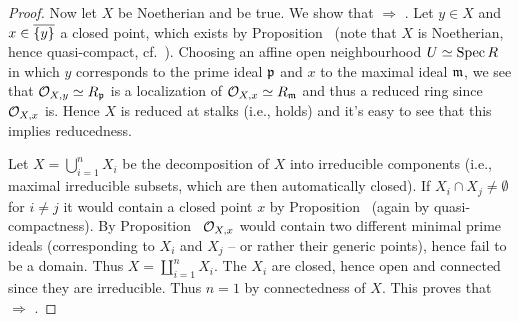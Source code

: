 \documentclass[a4paper,parskip=half,numbers=enddot, DIV=12]{scrreprt}
\begin{document}
\begin{proof}
    Now let $X$ be Noetherian and  be true. We show that  $\Rightarrow$ . Let $y\in X$ and $x\in\overline{\{y\}}$ a closed point, which exists by Proposition~ (note that $X$ is Noetherian, hence quasi-compact, cf.\ \cite[Definition~2.1.2]{alg1}). Choosing an affine open neighbourhood $U\simeq \operatorname{Spec} R$ in which $y$ corresponds to the prime ideal $\mathfrak{p}$ and $x$ to the maximal ideal $\mathfrak{m}$, we see that $\mathcal{O}_{X,y}\simeq R_{\mathfrak{p}}$ is a localization of $\mathcal{O}_{X,x}\simeq R_{\mathfrak{m}}$ and thus a reduced ring since $\mathcal{O}_{X,x}$ is. Hence $X$ is reduced at stalks (i.e.,  holds) and it's easy to see that this implies reducedness.
    
    Let $X=\bigcup_{i=1}^nX_i$ be the decomposition of $X$ into irreducible components (i.e., maximal irreducible subsets, which are then automatically closed). If $X_i\cap X_j \neq \emptyset$ for $i\neq j$ it would contain a closed point $x$ by Proposition~ (again by quasi-compactness). By Proposition~ $\mathcal{O}_{X,x}$ would contain two different minimal prime ideals (corresponding to $X_i$ and $X_j$ -- or rather their generic points), hence fail to be a domain. Thus $X=\coprod_{i=1}^nX_i$. The $X_i$ are closed, hence open and connected since they are irreducible. Thus $n=1$ by connectedness of $X$. This proves that  $\Rightarrow$ .
\end{proof}
\end{document}
